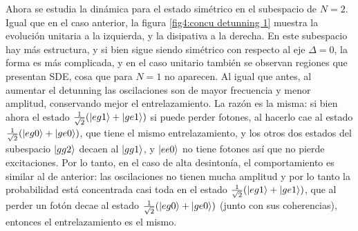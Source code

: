 Ahora se estudia la dinámica para el estado simétrico en el subespacio de $N=2$. Igual que en el caso anterior, la figura \ref{fig4:concu detunning 1} muestra la evolución unitaria a la izquierda, y la disipativa a la derecha. En este subespacio hay más estructura, y si bien sigue siendo simétrico con respecto al eje $\Delta=0$, la forma es más complicada, y en el caso unitario también se observan regiones que presentan SDE, cosa que para $N=1$ no aparecen. Al igual que antes, al aumentar el detunning las oscilaciones son de mayor frecuencia y menor amplitud, conservando mejor el entrelazamiento. La razón es la misma: si bien ahora el estado $\frac{1}{\sqrt{2}}(\ket{eg1}+\ket{ge1})$ si puede perder fotones, al hacerlo cae al estado $\frac{1}{\sqrt{2}}(\ket{eg0}+\ket{ge0})$, que tiene el mismo entrelazamiento, y los otros dos estados del subespacio $\ket{gg2}$ decaen al $\ket{gg1}$, y $\ket{ee0}$ no tiene fotones así que no pierde excitaciones. Por lo tanto, en el caso de alta desintonía, el comportamiento es similar al de anterior: las oscilaciones no tienen mucha amplitud y por lo tanto la probabilidad está concentrada casi toda en el estado $\frac{1}{\sqrt{2}}(\ket{eg1}+\ket{ge1})$, que al perder un fotón decae al estado $\frac{1}{\sqrt{2}}(\ket{eg0}+\ket{ge0})$ (junto con sus coherencias), entonces el entrelazamiento es el mismo.
